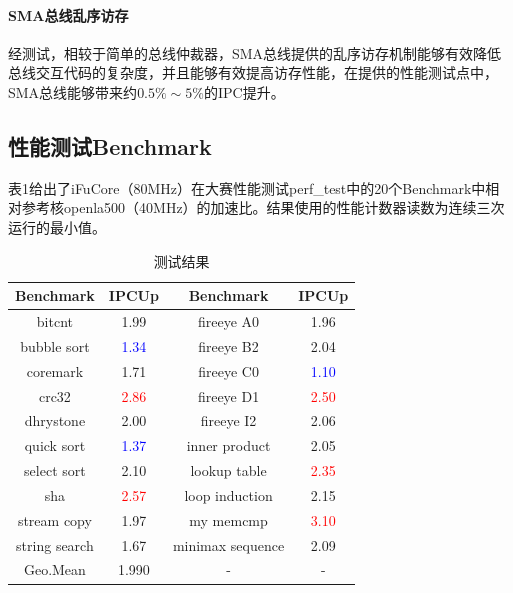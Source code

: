 \documentclass{article}
\begin{document}
\paragraph{SMA总线乱序访存} 
经测试，相较于简单的总线仲裁器，SMA总线提供的乱序访存机制能够有效降低总线交互代码的复杂度，并且能够有效提高访存性能，在提供的性能测试点中，SMA总线能够带来约$0.5\% \sim 5\%$的IPC提升。\par

\subsection{性能测试Benchmark}
表1给出了iFuCore（80MHz）在大赛性能测试perf\_test中的20个Benchmark中相对参考核openla500（40MHz）的加速比。结果使用的性能计数器读数为连续三次运行的最小值。
\begin{table}[h]
    \begin{center}
        \begin{tabular}{|cc|cc|}
            \hline
            Benchmark & IPCUp & Benchmark & IPCUp \\
            \hline
            bitcnt &  1.99       & fireeye A0 & 1.96\\
            bubble sort & \textcolor{blue}{1.34}   & fireeye B2 & 2.04\\
            coremark & 1.71      & fireeye C0 & \textcolor{blue}{1.10}\\
            crc32 & \textcolor{red}{2.86}        & fireeye D1 & \textcolor{red}{2.50}\\
            dhrystone & 2.00     & fireeye I2 & 2.06\\
            quick sort & \textcolor{blue}{1.37}    & inner product & 2.05\\
            select sort & 2.10   & lookup table & \textcolor{red}{2.35}\\
            sha & \textcolor{red}{2.57}          & loop induction & 2.15\\
            stream copy & 1.97   & my memcmp & \textcolor{red}{3.10}\\
            string search & 1.67 & minimax sequence & 2.09\\
            \hline
            Geo.Mean & 1.990 & - & - \\
            \hline
        \end{tabular}
        \caption{测试结果}
    \end{center}
\end{table}
\end{document}
